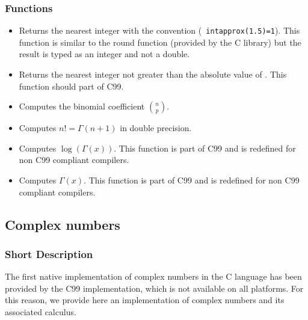 \subsubsection{Functions}
\begin{itemize}
\item {}
  \sshortdescribe Returns the nearest integer with the convention ({\tt
    intapprox(1.5)=1}). This function is similar to the round function
  (provided by the C library) but the result is typed as an integer and not a
  double.

\item {}
  \sshortdescribe Returns the nearest integer not greater than the absolute
  value of . This function should part of C99.

\item {}
  \sshortdescribe Computes the binomial coefficient $\binom{n}{p}$.

\item {}
  \sshortdescribe Computes $n! = \Gamma(n+1)$ in double precision.

\item {}
  \sshortdescribe Computes $\log(\Gamma(x))$. This function is part of C99 and is
  redefined for non C99 compliant compilers.

\item {}
  \sshortdescribe Computes $\Gamma(x)$. This function is part of C99 and is
  redefined for non C99 compliant compilers.

\end{itemize}

\subsection{Complex numbers}
\subsubsection{Short Description}

The first native implementation of complex numbers in the C language has been
provided by the C99 implementation, which is not available on all
platforms. For this reason, we provide here an implementation of complex
numbers and its associated calculus.

